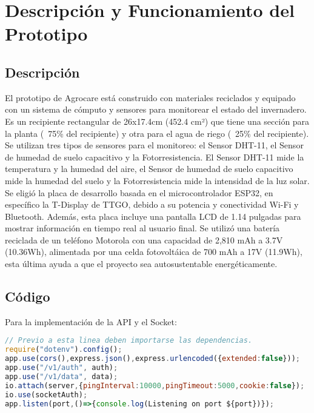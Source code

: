 \section{Descripción y Funcionamiento del Prototipo}
\subsection{Descripción}
El prototipo de Agrocare está construido con materiales reciclados y equipado con un sistema de cómputo y sensores para monitorear el estado del invernadero. Es un recipiente rectangular de 26x17.4cm (452.4 cm²) que tiene una sección para la planta (~75\% del recipiente) y otra para el agua de riego (~25\% del recipiente).\\

Se utilizan tres tipos de sensores para el monitoreo: el Sensor DHT-11, el Sensor de humedad de suelo capacitivo y la Fotorresistencia. El Sensor DHT-11 mide la temperatura y la humedad del aire, el Sensor de humedad de suelo capacitivo mide la humedad del suelo y la Fotorresistencia mide la intensidad de la luz solar.\\

Se eligió la placa de desarrollo basada en el microcontrolador ESP32, en específico la T-Display de TTGO, debido a su potencia y conectividad Wi-Fi y Bluetooth. Además, esta placa incluye una pantalla LCD de 1.14 pulgadas para mostrar información en tiempo real al usuario final. Se utilizó una batería reciclada de un teléfono Motorola con una capacidad de 2,810 mAh a 3.7V (10.36Wh), alimentada por una celda fotovoltáica de 700 mAh a 17V (11.9Wh), esta última ayuda a que el proyecto sea autosustentable energéticamente.

\subsection{Código}
Para la implementación de la API y el Socket:
\lstset{language=JavaScript}
\begin{lstlisting}[language=JavaScript]
// Previo a esta linea deben importarse las dependencias.
require("dotenv").config();
app.use(cors(),express.json(),express.urlencoded({extended:false}));
app.use("/v1/auth", auth);
app.use("/v1/data", data);
io.attach(server,{pingInterval:10000,pingTimeout:5000,cookie:false});
io.use(socketAuth);
app.listen(port,()=>{console.log(Listening on port ${port})});
\end{lstlisting}
\vspace{0.3cm}
